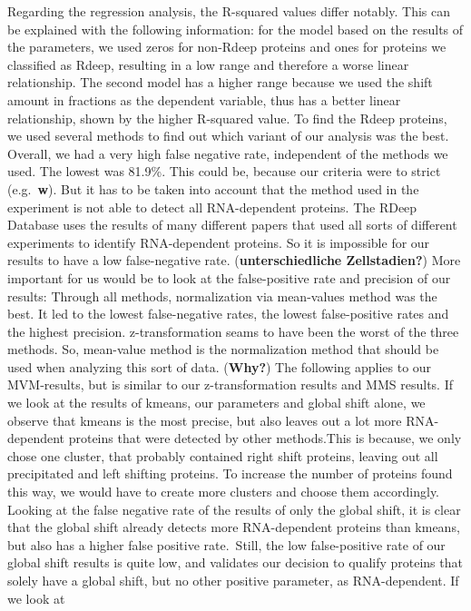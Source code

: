 \documentclass[
  12pt,
]{article}
\begin{document}
Regarding the regression analysis, the R-squared values differ notably.
This can be explained with the following information: for the model
based on the results of the parameters, we used zeros for non-Rdeep
proteins and ones for proteins we classified as Rdeep, resulting in a
low range and therefore a worse linear relationship. The second model
has a higher range because we used the shift amount in fractions as the
dependent variable, thus has a better linear relationship, shown by the
higher R-squared value. To find the Rdeep proteins, we used several
methods to find out which variant of our analysis was the best. Overall,
we had a very high false negative rate, independent of the methods we
used. The lowest was 81.9\%. This could be, because our criteria were to
strict (e.g.~\textbf{w}). But it has to be taken into account that the
method used in the experiment is not able to detect all RNA-dependent
proteins. The RDeep Database uses the results of many different papers
that used all sorts of different experiments to identify RNA-dependent
proteins. So it is impossible for our results to have a low
false-negative rate. (\textbf{unterschiedliche Zellstadien?}) More
important for us would be to look at the false-positive rate and
precision of our results: Through all methods, normalization via
mean-values method was the best. It led to the lowest false-negative
rates, the lowest false-positive rates and the highest precision.
z-transformation seams to have been the worst of the three methods. So,
mean-value method is the normalization method that should be used when
analyzing this sort of data. (\textbf{Why?}) The following applies to
our MVM-results, but is similar to our z-transformation results and MMS
results. If we look at the results of kmeans, our parameters and global
shift alone, we observe that kmeans is the most precise, but also leaves
out a lot more RNA-dependent proteins that were detected by other
methods.This is because, we only chose one cluster, that probably
contained right shift proteins, leaving out all precipitated and left
shifting proteins. To increase the number of proteins found this way, we
would have to create more clusters and choose them accordingly. Looking
at the false negative rate of the results of only the global shift, it
is clear that the global shift already detects more RNA-dependent
proteins than kmeans, but also has a higher false positive rate.~Still,
the low false-positive rate of our global shift results is quite low,
and validates our decision to qualify proteins that solely have a global
shift, but no other positive parameter, as RNA-dependent. If we look at
\end{document}
